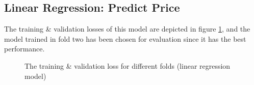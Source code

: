 \documentclass[12pt,twoside]{report}
\begin{document}
\subsection{Linear Regression: Predict Price}
The training \& validation losses of this model are depicted in figure \ref{linear_regression_fold_5}, and the model trained in fold two has been chosen for evaluation since it has the best performance. 
\\
\begin{figure}[!htbp]
	\centering
	\hfill
	\hfill
	\hfil
	\hfil
	\caption{The training \& validation loss for different folds (linear regression model)}
	\label{linear_regression_fold_5}
\end{figure}
\end{document}
